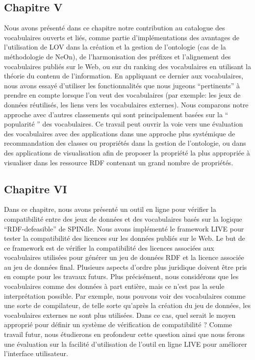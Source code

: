 \subsection*{Chapitre V}
Nous avons pr\'{e}sent\'{e} dans ce chapitre notre contribution au catalogue des vocabulaires ouverts et li\'{e}s, comme partie d'impl\'{e}mentations des avantages de l'utilisation de LOV dans la cr\'{e}ation et la gestion de l'ontologie (cas de la m\'{e}thodologie de NeOn), de l'harmonisation des pr\'{e}fixes et l'alignement des vocabulaires publi\'{e}s sur le Web, ou sur du ranking des vocabulaires en utilisant la th\'{e}orie du contenu de l'information. En appliquant ce dernier aux vocabulaires, nous avons essay\'{e} d'utiliser les fonctionnalit\'{e}s que nous jugeons ``pertinents''  \`{a} prendre en compte lorsque l'on veut des vocabulaires (par exemple: les jeux de donn\'{e}es r\'{e}utilis\'{e}s, les liens vers les vocabulaires externes). Nous comparons notre approche avec d'autres classements qui sont principalement bas\'{e}es sur la `` popularit\'{e} '' des vocabulaires. Ce travail peut ouvrir la voie vers une \'{e}valuation des vocabulaires avec des applications dans une approche plus syst\'{e}mique de recommandation des classes ou propri\'{e}t\'{e}s dans la gestion de l'ontologie, ou dans des applications de visualisation afin de proposer la  propri\'{e}t\'{e} la plus appropri\'{e}e \`{a} visualiser dans les ressource RDF contenant un grand nombre de propri\'{e}t\'{e}s.

\subsection*{Chapitre VI}
Dans ce chapitre, nous avons pr\'{e}sent\'{e} un outil en ligne pour v\'{e}rifier la compatibilit\'{e} entre des jeux de donn\'{e}es et des vocabulaires bas\'{e}s sur la logique ``RDF-defeasible'' de SPINdle. Nous avons impl\'{e}ment\'{e} le framework LIVE pour tester la compatibilit\'{e} des licences sur les donn\'{e}es publi\'{e}s sur le Web. Le but de ce framework est de v\'{e}rifier la compatibilit\'{e} des licences associ\'{e}es aux vocabulaires utilis\'{e}es pour g\'{e}n\'{e}rer un jeu de donn\'{e}es RDF et la licence associ\'{e}e au jeu de donn\'{e}es final. Plusieurs aspects d'ordre plus juridique doivent \^{e}tre pris en compte pour les travaux futurs. Plus pr\'{e}cis\'{e}ment, nous consid\'{e}rons que les vocabulaires comme des donn\'{e}es \`{a} part enti\`{e}re, mais ce n'est pas la seule interpr\'{e}tation possible. Par exemple, nous pouvons voir des vocabulaires comme une sorte de compilateur, de telle sorte qu'apr\`{e}s la cr\'{e}ation du jeu de donn\'{e}es, les vocabulaires externes ne sont plus utilis\'{e}es. Dans ce cas, quel serait le moyen appropri\'{e} pour d\'{e}finir un syst\`{e}me de v\'{e}rification de compatibilit\'{e} ? Comme travail futur, nous \'{e}tudierons en profondeur cette question ainsi que nous ferons une \'{e}valuation sur la facilit\'{e} d'utilisation de l'outil en ligne LIVE pour am\'{e}liorer l'interface utilisateur.

